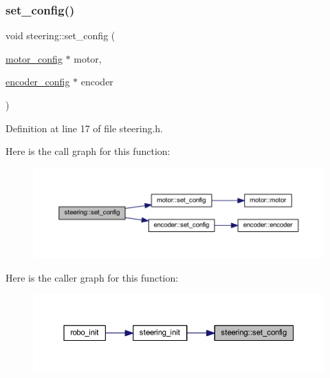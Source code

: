 \subsubsection{\texorpdfstring{set\_config()}{set\_config()}}
{\footnotesize\ttfamily void steering\+::set\+\_\+config (\begin{DoxyParamCaption}\item[{\mbox{\hyperlink{structmotor__config}{motor\+\_\+config}} $\ast$}]{motor,  }\item[{\mbox{\hyperlink{structencoder__config}{encoder\+\_\+config}} $\ast$}]{encoder }\end{DoxyParamCaption})\hspace{0.3cm}{\ttfamily [inline]}}



Definition at line 17 of file steering.\+h.

Here is the call graph for this function\+:
\nopagebreak
\begin{figure}[H]
\begin{center}
\leavevmode
\includegraphics[width=350pt]{classsteering_a849eba14376618441a86e0ccdc1dc066_cgraph}
\end{center}
\end{figure}
Here is the caller graph for this function\+:
\nopagebreak
\begin{figure}[H]
\begin{center}
\leavevmode
\includegraphics[width=350pt]{classsteering_a849eba14376618441a86e0ccdc1dc066_icgraph}
\end{center}
\end{figure}
\mbox{\label{classsteering_a3f041a24795b6f4f886f46ca23dbc3e6}} 
